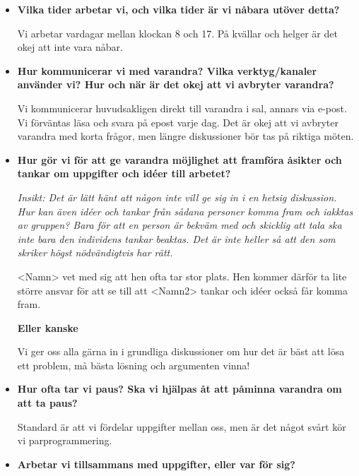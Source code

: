 \documentclass{mall}
\begin{document}
\begin{itemize}
\item \textbf{Vilka tider arbetar vi, och vilka tider är vi nåbara utöver detta?}

  Vi arbetar vardagar mellan klockan 8 och 17. På kvällar och helger är det okej att inte vara nåbar.

\item \textbf{Hur kommunicerar vi med varandra? Vilka verktyg/kanaler använder vi? Hur och när är det okej att vi avbryter varandra?}

  Vi kommunicerar huvudsakligen direkt till varandra i sal, annars via e-post. Vi förväntas läsa och
  svara på epost varje dag. Det är okej att vi avbryter varandra med korta frågor, men längre
  diskussioner bör tas på riktiga möten.


  \item \textbf{Hur gör vi för att ge varandra möjlighet att framföra åsikter och tankar om uppgifter och idéer till arbetet?}

  \emph{Insikt: Det är lätt hänt att någon inte vill ge sig in i en hetsig diskussion. Hur kan även
  idéer och tankar från sådana personer komma fram och iakktas av gruppen? Bara för att en person
  är bekväm med och skicklig att tala ska inte bara den individens tankar beaktas. Det är inte heller så att den som skriker högst nödvändigtvis har rätt.}

  <Namn> vet med sig att hen ofta tar stor plats. Hen kommer därför ta lite större ansvar för att se till
  att <Namn2> tankar och idéer också får komma fram.

  \textbf{Eller kanske}

  Vi ger oss alla gärna in i grundliga diskussioner om hur det är bäst att lösa ett problem, må bästa
  lösning och argumenten vinna!

\item \textbf{Hur ofta tar vi paus? Ska vi hjälpas åt att påminna varandra om att ta paus?}

  Standard är att vi fördelar uppgifter mellan oss, men är det något svårt kör vi parprogrammering.

\item \textbf{Arbetar vi tillsammans med uppgifter, eller var för sig?}


\end{itemize}
\end{document}
